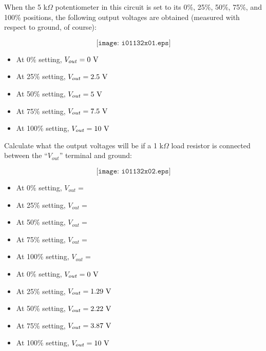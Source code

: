 

When the 5 k$\Omega$ potentiometer in this circuit is set to its 0\%, 25\%, 50\%, 75\%, and 100\% positions, the following output voltages are obtained (measured with respect to ground, of course):

$$\texttt{[image: i01132x01.eps]}$$

\begin{itemize}
\item{} At 0\% setting, $V_{out} = 0 \hbox{ V}$
\item{} At 25\% setting, $V_{out} = 2.5 \hbox{ V}$
\item{} At 50\% setting, $V_{out} = 5 \hbox{ V}$
\item{} At 75\% setting, $V_{out} = 7.5 \hbox{ V}$
\item{} At 100\% setting, $V_{out} = 10 \hbox{ V}$
\end{itemize}

Calculate what the output voltages will be if a 1 k$\Omega$ load resistor is connected between the ``$V_{out}$'' terminal and ground:

$$\texttt{[image: i01132x02.eps]}$$

\begin{itemize}
\item{} At 0\% setting, $V_{out} = $
\item{} At 25\% setting, $V_{out} = $
\item{} At 50\% setting, $V_{out} = $
\item{} At 75\% setting, $V_{out} = $
\item{} At 100\% setting, $V_{out} = $
\end{itemize}






\begin{itemize}
\item{} At 0\% setting, $V_{out} = 0 \hbox{ V}$
\item{} At 25\% setting, $V_{out} = 1.29 \hbox{ V}$
\item{} At 50\% setting, $V_{out} = 2.22 \hbox{ V}$
\item{} At 75\% setting, $V_{out} = 3.87 \hbox{ V}$
\item{} At 100\% setting, $V_{out} = 10 \hbox{ V}$
\end{itemize}





